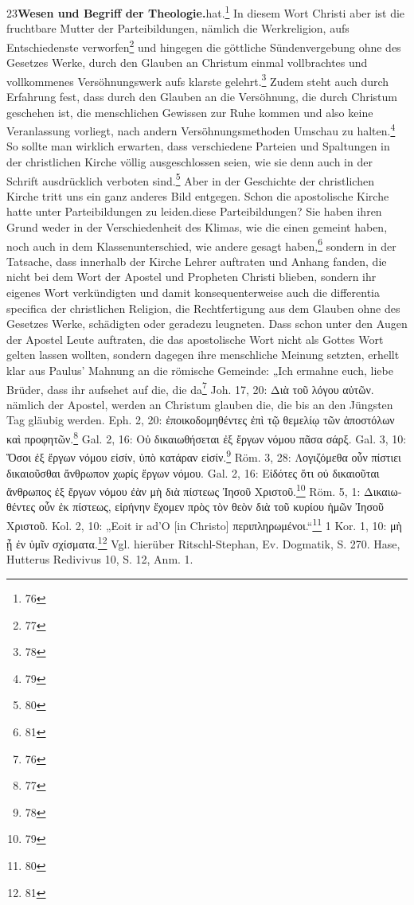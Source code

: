 23\n\textbf{Wesen und Begriff der Theologie.}\n\ngegeben hat.\footnote{76} In diesem Wort Christi aber ist die fruchtbare Mutter der Parteibildungen, nämlich die Werkreligion, aufs Entschiedenste verworfen\footnote{77} und hingegen die göttliche Sündenvergebung ohne des Gesetzes Werke, durch den Glauben an Christum einmal vollbrachtes und vollkommenes Versöhnungswerk aufs klarste gelehrt.\footnote{78} Zudem steht auch durch Erfahrung fest, dass durch den Glauben an die Versöhnung, die durch Christum geschehen ist, die menschlichen Gewissen zur Ruhe kommen und also keine Veranlassung vorliegt, nach andern Versöhnungsmethoden Umschau zu halten.\footnote{79} So sollte man wirklich erwarten, dass verschiedene Parteien und Spaltungen in der christlichen Kirche völlig ausgeschlossen seien, wie sie denn auch in der Schrift ausdrücklich verboten sind.\footnote{80} Aber in der Geschichte der christlichen Kirche tritt uns ein ganz anderes Bild entgegen. Schon die apostolische Kirche hatte unter Parteibildungen zu leiden.\n\nWoher diese Parteibildungen? Sie haben ihren Grund weder in der Verschiedenheit des Klimas, wie die einen gemeint haben, noch auch in dem Klassenunterschied, wie andere gesagt haben,\footnote{81} sondern in der Tatsache, dass innerhalb der Kirche Lehrer auftraten und Anhang fanden, die nicht bei dem Wort der Apostel und Propheten Christi blieben, sondern ihr eigenes Wort verkündigten und damit konsequenterweise auch die differentia specifica der christlichen Religion, die Rechtfertigung aus dem Glauben ohne des Gesetzes Werke, schädigten oder geradezu leugneten. Dass schon unter den Augen der Apostel Leute auftraten, die das apostolische Wort nicht als Gottes Wort gelten lassen wollten, sondern dagegen ihre menschliche Meinung setzten, erhellt klar aus Paulus’ Mahnung an die römische Gemeinde: „Ich ermahne euch, liebe Brüder, dass ihr aufsehet auf die, die da\n\n\n\n\footnote{76} Joh. 17, 20: \textgreek{Διὰ τοῦ λόγου αὐτῶν}. nämlich der Apostel, werden an Christum glauben die, die bis an den Jüngsten Tag gläubig werden. Eph. 2, 20: \textgreek{ἐποικοδομηθέντες ἐπὶ τῷ θεμελίῳ τῶν ἀποστόλων καὶ προφητῶν}.\n\footnote{77} Gal. 2, 16: \textgreek{Οὐ δικαιωθήσεται ἐξ ἔργων νόμου πᾶσα σάρξ}. Gal. 3, 10: \textgreek{Ὅσοι ἐξ ἔργων νόμου εἰσίν, ὑπὸ κατάραν εἰσίν}.\n\footnote{78} Röm. 3, 28: \textgreek{Λογιζόμεθα οὖν πίστιει δικαιοῦσθαι ἄνθρωπον χωρίς ἔργων νόμου}. Gal. 2, 16: \textgreek{Εἰδότες ὅτι οὐ δικαιοῦται ἄνθρωπος ἐξ ἔργων νόμου ἐὰν μὴ διὰ πίστεως Ἰησοῦ Χριστοῦ}.\n\footnote{79} Röm. 5, 1: \textgreek{Δικαιωθέντες οὖν ἐκ πίστεως, εἰρήνην ἔχομεν πρὸς τὸν θεὸν διὰ τοῦ κυρίου ἡμῶν Ἰησοῦ Χριστοῦ}. Kol. 2, 10: „Eoit ir ad’O [in Christo] περιπληρωμένοι.“\n\footnote{80} 1 Kor. 1, 10: \textgreek{μὴ ᾖ ἐν ὑμῖν σχίσματα}.\n\footnote{81} Vgl. hierüber Ritschl-Stephan, Ev. Dogmatik, S. 270. Hase, Hutterus Redivivus 10, S. 12, Anm. 1.